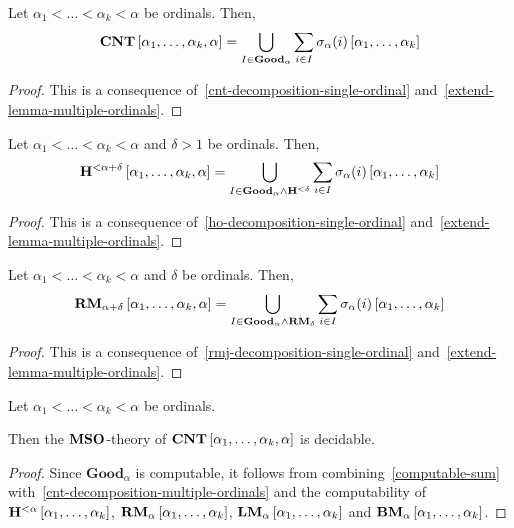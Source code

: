 \begin{lemma}\label{cnt-decomposition-multiple-ordinals}
  Let $\alpha_1 < \ldots < \alpha_k < \alpha$ be ordinals. Then,
  \[
    \mathbf{CNT} \left[ {\alpha_1, \ldots, \alpha_k, \alpha} \right]
    = \bigcup_{I \in \mathbf{Good}_{\alpha}} \sum_{i \in I} \sigma_{\alpha}(i) \left[ {\alpha_1, \ldots, \alpha_k} \right]
  \]
\end{lemma}

\begin{proof}
  This is a consequence of~\cref{cnt-decomposition-single-ordinal}
  and~\cref{extend-lemma-multiple-ordinals}.
\end{proof}

\begin{lemma}\label{ho-decomposition-multiple-ordinals}
  Let $\alpha_1 < \ldots < \alpha_k < \alpha$ and $\delta > 1$ be ordinals. Then,
  \[
    \mathbf{H}^{< \alpha + \delta} \left[ {\alpha_1, \ldots, \alpha_k, \alpha} \right]
    = \bigcup_{I \in \mathbf{Good}_{\alpha} \wedge \mathbf{H}^{< \delta}}
    \sum_{i \in I} \sigma_{\alpha}(i) \left[ {\alpha_1, \ldots, \alpha_k} \right]
  \]
\end{lemma}

\begin{proof}
  This is a consequence of~\cref{ho-decomposition-single-ordinal}
  and~\cref{extend-lemma-multiple-ordinals}.
\end{proof}

\begin{lemma}\label{rmj-decomposition-multiple-ordinals}
  Let $\alpha_1 < \ldots < \alpha_k < \alpha$ and $\delta$ be ordinals.
  Then,
  \[
    \mathbf{RM}_{\alpha + \delta} \left[ {\alpha_1, \ldots, \alpha_k, \alpha} \right]
    = \bigcup_{I \in \mathbf{Good}_{\alpha} \wedge \mathbf{RM}_{\delta}}
    \sum_{i \in I} \sigma_{\alpha}(i) \left[ {\alpha_1, \ldots, \alpha_k} \right]
  \]
\end{lemma}

\begin{proof}
  This is a consequence of~\cref{rmj-decomposition-single-ordinal}
  and~\cref{extend-lemma-multiple-ordinals}.
\end{proof}

\begin{lemma}\label{cnt-decidable-multiple-ordinals}
  Let $\alpha_1 < \ldots < \alpha_k < \alpha$ be ordinals.

  Then the $\mathbf{MSO}$-theory of $\mathbf{CNT} \left[ {\alpha_1, \ldots, \alpha_k, \alpha} \right]$
  is decidable.
\end{lemma}

\begin{proof}
  Since $\mathbf{Good}_{\alpha}$ is computable,
  it follows from combining~\cref{computable-sum}
  with~\cref{cnt-decomposition-multiple-ordinals} and the computability
  of $\mathbf{H}^{< \alpha} \left[ {\alpha_1, \ldots, \alpha_k} \right]$,
  $\mathbf{RM}_{\alpha} \left[ {\alpha_1, \ldots, \alpha_k} \right]$,
  $\mathbf{LM}_{\alpha} \left[ {\alpha_1, \ldots, \alpha_k} \right]$ and
  $\mathbf{BM}_{\alpha} \left[ {\alpha_1, \ldots, \alpha_k} \right]$.
\end{proof}

